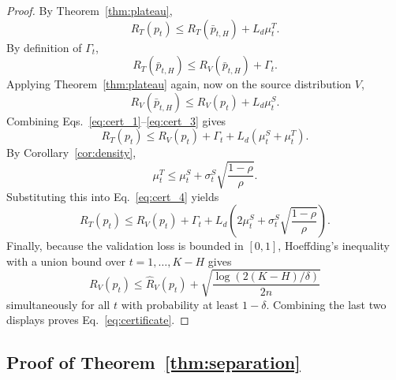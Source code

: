 \documentclass{article}
\begin{document}
\begin{proof}
By Theorem~\ref{thm:plateau},
\begin{equation}
    R_T(p_t)
    \le
    R_T(\bar p_{t,H}) + L_d \mu_t^T.
    \label{eq:cert_1}
\end{equation}
By definition of $\Gamma_t$,
\begin{equation}
    R_T(\bar p_{t,H})
    \le
    R_V(\bar p_{t,H}) + \Gamma_t.
    \label{eq:cert_2}
\end{equation}
Applying Theorem~\ref{thm:plateau} again, now on the source distribution $V$,
\begin{equation}
    R_V(\bar p_{t,H})
    \le
    R_V(p_t) + L_d \mu_t^S.
    \label{eq:cert_3}
\end{equation}
Combining Eqs.~\eqref{eq:cert_1}--\eqref{eq:cert_3} gives
\begin{equation}
    R_T(p_t)
    \le
    R_V(p_t) + \Gamma_t + L_d(\mu_t^S+\mu_t^T).
    \label{eq:cert_4}
\end{equation}
By Corollary~\ref{cor:density},
\begin{equation}
    \mu_t^T
    \le
    \mu_t^S + \sigma_t^S \sqrt{\frac{1-\rho}{\rho}}.
\end{equation}
Substituting this into Eq.~\eqref{eq:cert_4} yields
\begin{equation}
    R_T(p_t)
    \le
    R_V(p_t)
    +
    \Gamma_t
    +
    L_d\left(
        2\mu_t^S + \sigma_t^S \sqrt{\frac{1-\rho}{\rho}}
    \right).
\end{equation}
Finally, because the validation loss is bounded in $[0,1]$, Hoeffding's inequality with a union bound over $t=1,\dots,K-H$ gives
\begin{equation}
    R_V(p_t)
    \le
    \hat R_V(p_t) + \sqrt{\frac{\log(2(K-H)/\delta)}{2n}}
\end{equation}
simultaneously for all $t$ with probability at least $1-\delta$. Combining the last two displays proves Eq.~\eqref{eq:certificate}.
\end{proof}

\subsection{Proof of Theorem~\ref{thm:separation}}
\end{document}
